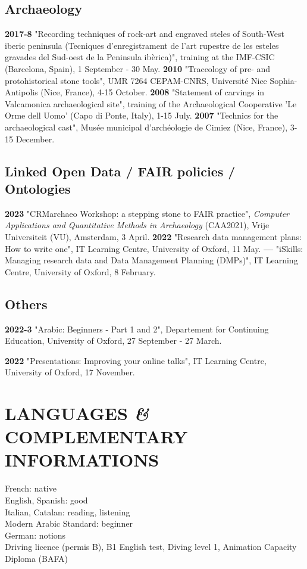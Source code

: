 \documentclass{article}
\begin{document}
\subsection*{Archaeology}

\textbf{2017-8 } "Recording techniques of rock-art and engraved steles of South-West iberic peninsula (Tecniques d'enregistrament de l'art rupestre de les esteles gravades del Sud-oest de la Peninsula ibèrica)", training at the IMF-CSIC (Barcelona, Spain), 1 September - 30 May.
\smallbreak
\textbf{2010 } "Traceology of pre- and protohistorical stone tools", UMR 7264 CEPAM-CNRS, Universit\'{e} Nice Sophia-Antipolis (Nice, France), 4-15 October.
\smallbreak
\textbf{2008 } "Statement of carvings in Valcamonica archaeological site", training of the Archaeological Cooperative 'Le Orme dell Uomo' (Capo di Ponte, Italy), 1-15 July.
\smallbreak
\textbf{2007 } "Technics for the archaeological cast", Mus\'{e}e municipal d'arch\'{e}ologie de Cimiez (Nice, France), 3-15 December.

\subsection*{Linked Open Data / FAIR policies / Ontologies}

\textbf{2023 }"CRMarchaeo Workshop: a stepping stone to FAIR practice", \textit{Computer Applications and Quantitative Methods in Archaeology} (CAA2021), Vrije Universiteit (VU), Amsterdam, 3 April.
\smallbreak
\textbf{2022 }"Research data management plans: How to write one", IT Learning Centre, University of Oxford, 11 May.
\smallbreak
\textbf{--- }"iSkills: Managing research data and Data Management Planning (DMPs)", IT Learning Centre, University of Oxford, 8 February.

\subsection*{Others}

\textbf{2022-3 }"Arabic: Beginners - Part 1 and 2", Departement for Continuing Education, University of Oxford, 27 September - 27 March.
\smallbreak

\textbf{2022 }"Presentations: Improving your online talks", IT Learning Centre, University of Oxford, 17 November.
\smallbreak

\section*{LANGUAGES \textit{\&} COMPLEMENTARY INFORMATIONS}

French: native \\
English, Spanish: good \\
Italian, Catalan: reading, listening \\
Modern Arabic Standard: beginner \\
German: notions \\

Driving licence (permis B), B1 English test, Diving level 1, Animation Capacity Diploma (BAFA)
\end{document}
